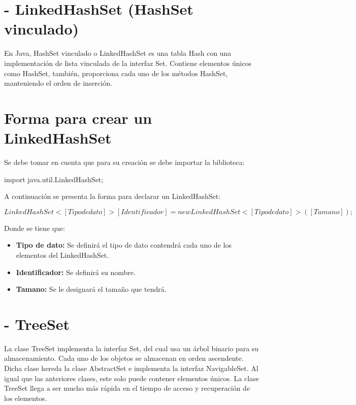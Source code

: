 \documentclass[12pt, letterpaper]{article} %
\begin{document}
\section*{- LinkedHashSet (HashSet vinculado)}
En Java, HashSet vinculado o LinkedHashSet es una tabla Hash con una implementación de lista vinculada de la interfaz Set.
Contiene elementos únicos como HashSet, también, proporciona cada uno de los métodos HashSet, manteniendo el orden de inserción.

\section*{Forma para crear un LinkedHashSet}
Se debe tomar en cuenta que para su creación se debe importar la biblioteca:
\begin{center}
    import java.util.LinkedHashSet;
\end{center}
A continuación se presenta la forma para declarar un LinkedHashSet:
\begin{center}
    $LinkedHashSet<[Tipo de dato]> [Identificador] = new LinkedHashSet<[Tipo de dato]>([Tamano]);$
\end{center}
Donde se tiene que:
\begin{itemize}
    \item \textbf{Tipo de dato:} Se definirá el tipo de dato contendrá cada uno de los elementos del LinkedHashSet.
    \item \textbf{Identificador:} Se definirá su nombre.
    \item \textbf{Tamano:} Se le designará el tamaño que tendrá.
\end{itemize}

\section*{- TreeSet}
La clase TreeSet implementa la interfaz Set, del cual usa un árbol binario para su almacenamiento. Cada uno de los objetos se almacenan en orden ascendente. Dicha clase hereda la clase AbstractSet e implementa la interfaz NavigableSet. Al igual que las anteriores clases, este solo puede contener elementos únicos. La clase TreeSet llega a ser mucho más rápida en el tiempo de acceso y recuperación de los elementos.
\end{document}
